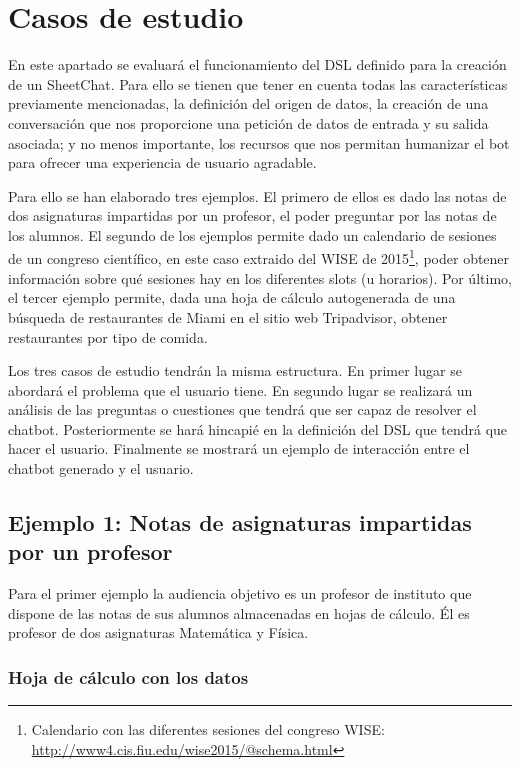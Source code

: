 \chapter{Casos de estudio}
\label{cha:CaseStudies}

En este apartado se evaluará el funcionamiento del DSL definido para la creación de un SheetChat. Para ello se tienen que tener en cuenta todas las características previamente mencionadas, la definición del origen de datos, la creación de una conversación que nos proporcione una petición de datos de entrada y su salida asociada; y no menos importante, los recursos que nos permitan humanizar el bot para ofrecer una experiencia de usuario agradable.

Para ello se han elaborado tres ejemplos. El primero de ellos es dado las notas de dos asignaturas impartidas por un profesor, el poder preguntar por las notas de los alumnos. El segundo de los ejemplos permite dado un calendario de sesiones de un congreso científico, en este caso extraido del WISE de 2015\footnote{Calendario con las diferentes sesiones del congreso WISE: \url{http://www4.cis.fiu.edu/wise2015/@schema.html}}, poder obtener información sobre qué sesiones hay en los diferentes slots (u horarios). Por último, el tercer ejemplo permite, dada una hoja de cálculo autogenerada de una búsqueda de restaurantes de Miami en el sitio web Tripadvisor, obtener restaurantes por tipo de comida.

Los tres casos de estudio tendrán la misma estructura. En primer lugar se abordará el problema que el usuario tiene. En segundo lugar se realizará un análisis de las preguntas o cuestiones que tendrá que ser capaz de resolver el chatbot. Posteriormente se hará hincapié en la definición del DSL que tendrá que hacer el usuario. Finalmente se mostrará un ejemplo de interacción entre el chatbot generado y el usuario.

\section{Ejemplo 1: Notas de asignaturas impartidas por un profesor}
\label{sec:EjemploNotas}

Para el primer ejemplo la audiencia objetivo es un profesor de instituto que dispone de las notas de sus alumnos almacenadas en hojas de cálculo. Él es profesor de dos asignaturas Matemática y Física.

\subsection{Hoja de cálculo con los datos}

